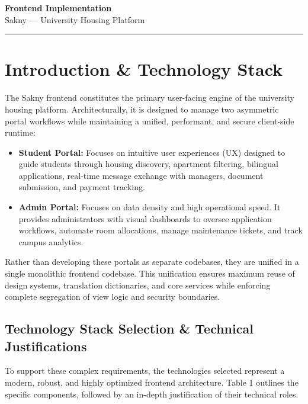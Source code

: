 \documentclass[12pt,a4paper]{article}
\begin{document}
\begin{center}
    {\LARGE\bfseries\color{codeblue} Frontend Implementation}\\[0.5em]
    {\large Sakny — University Housing Platform}\\[1em]
    \rule{0.6\textwidth}{0.5pt}
\end{center}

\tableofcontents
\newpage

\section{Introduction \& Technology Stack}

The Sakny frontend constitutes the primary user-facing engine of the university housing platform. Architecturally, it is designed to manage two asymmetric portal workflows while maintaining a unified, performant, and secure client-side runtime:
\begin{itemize}
    \item \textbf{Student Portal:} Focuses on intuitive user experiences (UX) designed to guide students through housing discovery, apartment filtering, bilingual applications, real-time message exchange with managers, document submission, and payment tracking.
    \item \textbf{Admin Portal:} Focuses on data density and high operational speed. It provides administrators with visual dashboards to oversee application workflows, automate room allocations, manage maintenance tickets, and track campus analytics.
\end{itemize}

Rather than developing these portals as separate codebases, they are unified in a single monolithic frontend codebase. This unification ensures maximum reuse of design systems, translation dictionaries, and core services while enforcing complete segregation of view logic and security boundaries.

\subsection{Technology Stack Selection \& Technical Justifications}

To support these complex requirements, the technologies selected represent a modern, robust, and highly optimized frontend architecture. Table 1 outlines the specific components, followed by an in-depth justification of their technical roles.
\end{document}
